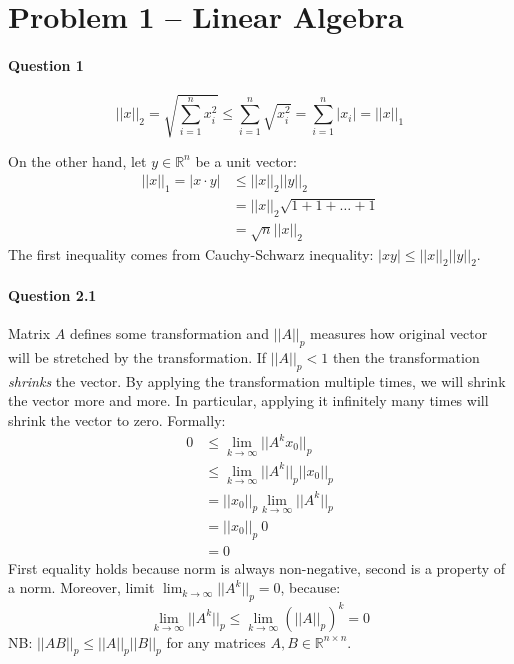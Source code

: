 \section{Problem 1 – Linear Algebra}
\paragraph{Question 1}
\begin{equation*}
  ||x||_2 = \sqrt{\sum_{i=1}^{n} x_{i}^2} \leq \sum_{i=1}^{n} \sqrt{x_{i}^2}
 = \sum_{i=1}^{n} |x_{i}| = ||x||_{1}  
\end{equation*}

On the other hand, let $y\in \mathbb{R}^n$ be a unit vector:
\begin{align*}
   ||x||_1 = | x \cdot y | &\leq ||x||_{2} ||y||_{2} \\
   &= ||x||_{2} \sqrt{1+1+\dots+1}  \\
   &= \sqrt{n}  ||x||_{2}
\end{align*}
The first inequality comes from Cauchy-Schwarz inequality: $|xy| \leq ||x||_2 ||y||_2$.

\paragraph{Question 2.1}
Matrix $A$ defines some transformation and $||A||_p$ measures how original vector will be stretched by the transformation.
If $||A||_p < 1$ then the transformation \textit{shrinks} the vector.
By applying the transformation multiple times, we will shrink the vector more and more.
In particular, applying it infinitely many times will shrink the vector to zero.
Formally:
\begin{align*}
0 &\leq \lim_{k \to \infty} ||A^k x_0||_p \\
      &\leq \lim_{k \to \infty} ||A^k||_p || x_0||_p \\
      &=  || x_0||_p \lim_{k \to \infty} ||A^k||_p  \\
      &=  || x_0||_p \: 0 \\
      &= 0
\end{align*}
First equality holds because norm is always non-negative,
second is a property of a norm. 
Moreover, limit $\lim_{k \to \infty} ||A^k||_p = 0$, because:
\begin{equation*}
    \lim_{k \to \infty} ||A^k||_p \leq \lim_{k \to \infty} (||A||_p)^k =0
\end{equation*}
NB: $||AB||_p \leq ||A||_p ||B||_p$ for any matrices $A,B \in \mathbb{R}^{n\times n}$.

